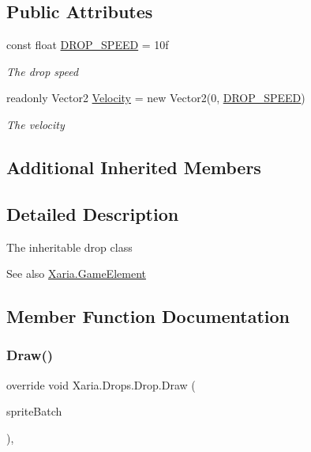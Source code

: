 \subsection*{Public Attributes}
\begin{DoxyCompactItemize}
\item 
const float \hyperlink{classXaria_1_1Drops_1_1Drop_a9b124fd6ebca83cbfaeb6a591e8717db}{D\+R\+O\+P\+\_\+\+S\+P\+E\+ED} = 10f
\begin{DoxyCompactList}\small\item\em The drop speed \end{DoxyCompactList}\item 
readonly Vector2 \hyperlink{classXaria_1_1Drops_1_1Drop_a51f2f721013d35bccfbbd1d85b65354e}{Velocity} = new Vector2(0, \hyperlink{classXaria_1_1Drops_1_1Drop_a9b124fd6ebca83cbfaeb6a591e8717db}{D\+R\+O\+P\+\_\+\+S\+P\+E\+ED})
\begin{DoxyCompactList}\small\item\em The velocity \end{DoxyCompactList}\end{DoxyCompactItemize}
\subsection*{Additional Inherited Members}


\subsection{Detailed Description}
The inheritable drop class 

\begin{DoxySeeAlso}{See also}
\hyperlink{classXaria_1_1GameElement}{Xaria.\+Game\+Element}


\end{DoxySeeAlso}


\subsection{Member Function Documentation}
\mbox{\label{classXaria_1_1Drops_1_1Drop_a2cd5c3912ae653526a7cc25aefa691b0}} 
\subsubsection{\texorpdfstring{Draw()}{Draw()}}
{\footnotesize\ttfamily override void Xaria.\+Drops.\+Drop.\+Draw (\begin{DoxyParamCaption}\item[{ref Sprite\+Batch}]{sprite\+Batch }\end{DoxyParamCaption})\hspace{0.3cm}{\ttfamily [inline]}, {\ttfamily [virtual]}}



